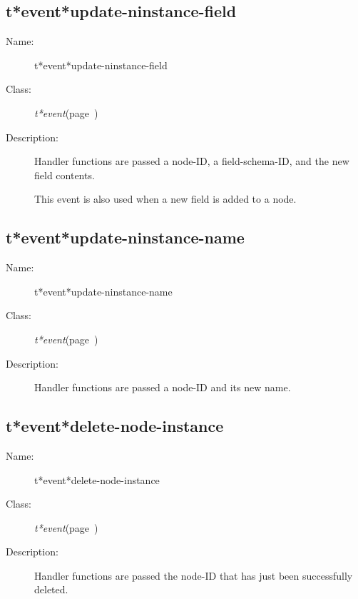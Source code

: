 \subsection{t*event*update-ninstance-field}
\label{t*event*update-ninstance-field}

\begin{description}
\item [Name:]  t*event*update-ninstance-field

\item [Class:] {\sl t*event}\hfill(page~\pageref{t*event})

\item [Description:]

Handler functions are passed a node-ID, a 
field-schema-ID, and the new field contents.

This event is also used when a new field is added
to a node.

\end{description}
\horizontalline

\subsection{t*event*update-ninstance-name}
\label{t*event*update-ninstance-name}

\begin{description}
\item [Name:]  t*event*update-ninstance-name

\item [Class:] {\sl t*event}\hfill(page~\pageref{t*event})

\item [Description:]

Handler functions are passed a node-ID and its
new name.


\end{description}
\horizontalline

\subsection{t*event*delete-node-instance}
\label{t*event*delete-node-instance}

\begin{description}
\item [Name:]  t*event*delete-node-instance

\item [Class:] {\sl t*event}\hfill(page~\pageref{t*event})

\item [Description:]

Handler functions are passed the node-ID that has just
been successfully deleted.


\end{description}
\horizontalline

